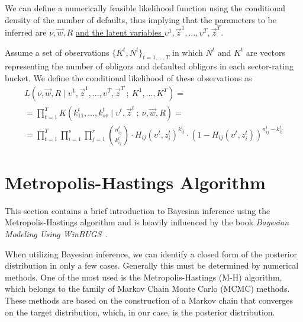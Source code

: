 \documentclass[11pt,fleqn]{book} %
\begin{document}
We can define a numerically feasible likelihood function using the 
conditional density of the number of defaults, thus implying that the 
parameters to be inferred are $\nu,\vec{w},R$ \ul{and the latent variables 
$\upsilon^1,\vec{z}^1,\dots,\upsilon^T,\vec{z}^T$}.

\begin{definition}
	\label{def:clik}
	Assume a set of observations $\{K^t, N^t\}_{t=1,\dots,T}$ in which $N^t$ 
	and $K^t$ are vectors representing the number of obligors and defaulted 
	obligors in each sector-rating bucket. We define the conditional 
	likelihood of these observations as
	\begin{displaymath}
		\begin{array}{l}
			L(\nu,\vec{w},R \mid \upsilon^1,\vec{z}^1,\dots,\upsilon^T,\vec{z}^T\ ;\ K^1,\dots,K^T) = \\
			= \displaystyle \prod_{t=1}^T K(k_{11}^t,\dots,k_{sr}^t \mid \upsilon^t,\vec{z}^t\ ;\ \nu,\vec{w},R) = \\
			= \displaystyle
			\prod_{t=1}^T \prod_{i=1}^s \prod_{j=1}^r 
			\binom{n_{ij}^t}{k_{ij}^t} \cdot
			H_{ij}(\upsilon^t,z_i^t)^{k_{ij}^t} \cdot
			\left( 1 - H_{ij}(\upsilon^t,z_i^t) \right)^{n_{ij}^t-k_{ij}^t}
		\end{array}
	\end{displaymath}
\end{definition}

\section{Metropolis-Hastings Algorithm}

This section contains a brief introduction to Bayesian inference using 
the Metropolis-Hastings algorithm and is heavily influenced by the book 
\emph{Bayesian Modeling Using WinBUGS}~\cite{ntzoufras:2009}.

When utilizing Bayesian inference, we can identify a closed form of the 
posterior distribution in only a few cases. Generally this must be determined 
by numerical methods. One of the most used is the Metropolis-Hastings (M-H)
algorithm, which belongs to the family of Markov Chain Monte Carlo (MCMC) 
methods. These methods are based on the construction of a Markov chain that 
converges on the target distribution, which, in our case, is the posterior 
distribution.
\end{document}
